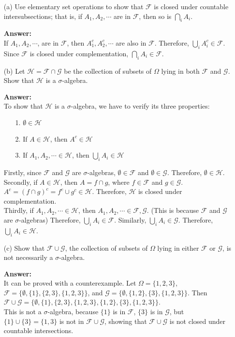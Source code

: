 \documentclass[12pt]{article}
\begin{document}
\begin{enumerate}
    \item[(a)] Use elementary set operations to show that $\mathcal{F}$ is closed under countable intersubsections; that is, if $A_{1},A_{2},\cdots$ are in $\mathcal{F}$, then so is $\bigcap_{i}A_{i}$.

    \textbf{Answer:} \\
    If $A_1, A_2, \cdots$, are in $\mathcal{F}$, then $A_1^c, A_2^c, \cdots$ are also in $\mathcal{F}$. Therefore, $\bigcup_{i}A_i^c \in \mathcal{F}$. Since $\mathcal{F}$ is closed under complementation, $\bigcap_{i}A_i \in \mathcal{F}$.

    \item[(b)] Let $\mathcal{H}=\mathcal{F}\cap\mathcal{G}$ be the collection of subsets of $\Omega$ lying in both $\mathcal{F}$ and $\mathcal{G}$. Show that $\mathcal{H}$ is a $\sigma$-algebra.

    \textbf{Answer:} \\
    To show that $\mathcal{H}$ is a $\sigma$-algebra, we have to verify its three properties:
    \begin{enumerate}
        \item[1.] $\emptyset\in\mathcal{H}$
        \item[2.] If $A\in\mathcal{H}$, then $A^c\in\mathcal{H}$
        \item[3.] If $A_1,A_2,\cdots\in\mathcal{H}$, then $\bigcup_{i}A_i\in\mathcal{H}$
    \end{enumerate}
    Firstly, since $\mathcal{F}$ and $\mathcal{G}$ are $\sigma$-algebras, $\emptyset\in\mathcal{F}$ and $\emptyset\in\mathcal{G}$. Therefore, $\emptyset\in\mathcal{H}$. \\
    Secondly, if $A\in\mathcal{H}$, then $A=f\cap g$, where $f\in\mathcal{F}$ and $g\in\mathcal{G}$. $A^c = \left(f\cap g\right)^c = f^c\cup g^c\in\mathcal{H}$. Therefore, $\mathcal{H}$ is closed under complementation. \\
    Thirdly, if $A_1,A_2,\cdots\in\mathcal{H}$, then $A_1, A_2, \cdots \in \mathcal{F}, \mathcal{G}$. (This is because $\mathcal{F}$ and $\mathcal{G}$ are $\sigma$-algebras) Therefore, $\bigcup_{i}A_i \in \mathcal{F}$. Similarly, $\bigcup_{i}A_i \in \mathcal{G}$. Therefore, $\bigcup_{i}A_i\in\mathcal{H}$. \\
    \item[(c)] Show that $\mathcal{F}\cup\mathcal{G}$, the collection of subsets of $\Omega$ lying in either $\mathcal{F}$ or $\mathcal{G}$, is not necessarily a $\sigma$-algebra.

    \textbf{Answer:} \\
    It can be proved with a counterexample. Let $\Omega = \{1, 2, 3\}$, 
    $\mathcal{F} = \{\emptyset, \{1\}, \{2, 3\}, \{1,2,3\}\}$, 
    and $\mathcal{G} = \{\emptyset,\{1,2\},\{3\},\{1,2,3\}\}$. 
    Then $\mathcal{F}\cup\mathcal{G} = \{\emptyset, \{1\}, \{2, 3\}, \{1,2,3\},\{1,2\},\{3\},\{1,2,3\}\}$. \\
    This is not a $\sigma$-algebra, because $\{1\}$ is in $\mathcal{F}$, $\{3\}$ is in $\mathcal{G}$, but$\{1\}\cup\{3\}=\{1,3\}$ is not in $\mathcal{F}\cup\mathcal{G}$, showing that $\mathcal{F}\cup\mathcal{G}$ is not closed under countable intersections.
\end{enumerate}
\end{document}
